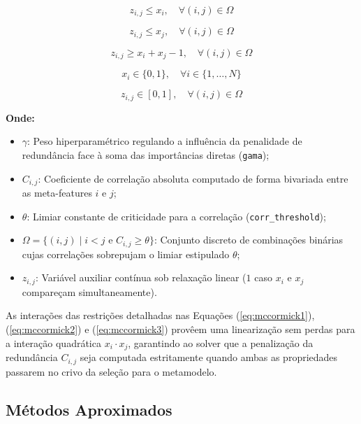 \documentclass[12pt]{article}
\begin{document}
\begin{equation} \label{eq:mccormick1}
z_{i,j} \le x_i, \quad \forall (i,j) \in \Omega
\end{equation}

\begin{equation} \label{eq:mccormick2}
z_{i,j} \le x_j, \quad \forall (i,j) \in \Omega
\end{equation}

\begin{equation} \label{eq:mccormick3}
z_{i,j} \ge x_i + x_j - 1, \quad \forall (i,j) \in \Omega
\end{equation}

\begin{equation}
x_i \in \{0, 1\}, \quad \forall i \in \{1, \dots, N\}
\end{equation}

\begin{equation}
z_{i,j} \in [0, 1], \quad \forall (i,j) \in \Omega
\end{equation}

\noindent \textbf{Onde:}
\begin{itemize}
    \itemsep0em
    \item $\gamma$: Peso hiperparamétrico regulando a influência da penalidade de redundância face à soma das importâncias diretas (\texttt{gama});
    \item $C_{i,j}$: Coeficiente de correlação absoluta computado de forma bivariada entre as meta-features $i$ e $j$;
    \item $\theta$: Limiar constante de criticidade para a correlação (\texttt{corr\_threshold});
    \item $\Omega = \{(i,j) \mid i < j \text{ e } C_{i,j} \ge \theta\}$: Conjunto discreto de combinações binárias cujas correlações sobrepujam o limiar estipulado $\theta$;
    \item $z_{i,j}$: Variável auxiliar contínua sob relaxação linear ($1$ caso $x_i$ e $x_j$ compareçam simultaneamente).
\end{itemize}

As interações das restrições detalhadas nas Equações (\ref{eq:mccormick1}), (\ref{eq:mccormick2}) e (\ref{eq:mccormick3}) provêem uma linearização sem perdas para a interação quadrática $x_i \cdot x_j$, garantindo ao solver que a penalização da redundância $C_{i,j}$ seja computada estritamente quando ambas as propriedades passarem no crivo da seleção para o metamodelo.

\subsection{Métodos Aproximados}
\end{document}
